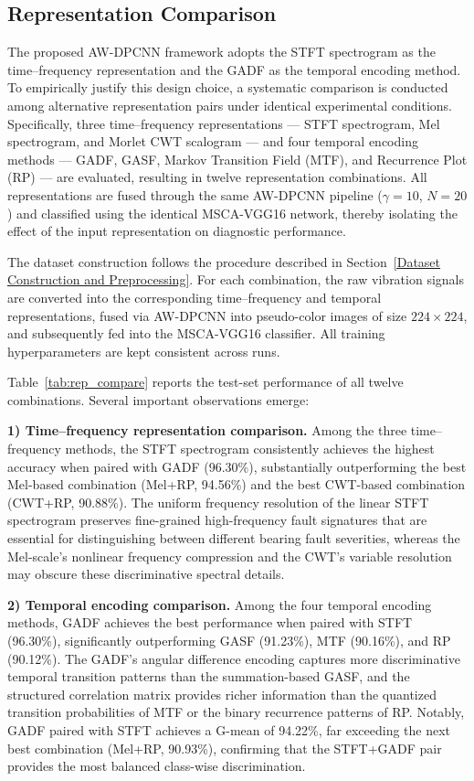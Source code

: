 \documentclass[journal]{IEEEtran}
\begin{document}
\subsection{Representation Comparison}
\label{sec:rep_compare}

The proposed AW-DPCNN framework adopts the STFT spectrogram as the time--frequency representation and the GADF as the temporal encoding method. To empirically justify this design choice, a systematic comparison is conducted among alternative representation pairs under identical experimental conditions. Specifically, three time--frequency representations — STFT spectrogram, Mel spectrogram, and Morlet CWT scalogram — and four temporal encoding methods — GADF, GASF, Markov Transition Field (MTF), and Recurrence Plot (RP) — are evaluated, resulting in twelve representation combinations. All representations are fused through the same AW-DPCNN pipeline ($\gamma=10$, $N=20$) and classified using the identical MSCA-VGG16 network, thereby isolating the effect of the input representation on diagnostic performance.

The dataset construction follows the procedure described in Section~\ref{Dataset Construction and Preprocessing}. For each combination, the raw vibration signals are converted into the corresponding time--frequency and temporal representations, fused via AW-DPCNN into pseudo-color images of size $224\times 224$, and subsequently fed into the MSCA-VGG16 classifier. All training hyperparameters are kept consistent across runs.



Table~\ref{tab:rep_compare} reports the test-set performance of all twelve combinations. Several important observations emerge:

\textbf{1) Time--frequency representation comparison.} Among the three time--frequency methods, the STFT spectrogram consistently achieves the highest accuracy when paired with GADF (96.30\%), substantially outperforming the best Mel-based combination (Mel+RP, 94.56\%) and the best CWT-based combination (CWT+RP, 90.88\%). The uniform frequency resolution of the linear STFT spectrogram preserves fine-grained high-frequency fault signatures that are essential for distinguishing between different bearing fault severities, whereas the Mel-scale's nonlinear frequency compression and the CWT's variable resolution may obscure these discriminative spectral details.

\textbf{2) Temporal encoding comparison.} Among the four temporal encoding methods, GADF achieves the best performance when paired with STFT (96.30\%), significantly outperforming GASF (91.23\%), MTF (90.16\%), and RP (90.12\%). The GADF's angular difference encoding captures more discriminative temporal transition patterns than the summation-based GASF, and the structured correlation matrix provides richer information than the quantized transition probabilities of MTF or the binary recurrence patterns of RP. Notably, GADF paired with STFT achieves a G-mean of 94.22\%, far exceeding the next best combination (Mel+RP, 90.93\%), confirming that the STFT+GADF pair provides the most balanced class-wise discrimination.
\end{document}
